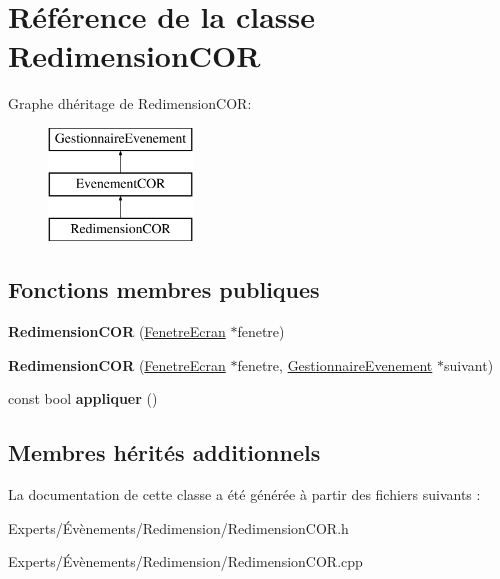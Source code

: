 \hypertarget{class_redimension_c_o_r}{}\section{Référence de la classe Redimension\+C\+OR}
\label{class_redimension_c_o_r}
Graphe d\textquotesingle{}héritage de Redimension\+C\+OR\+:\begin{figure}[H]
\begin{center}
\leavevmode
\includegraphics[height=3.000000cm]{class_redimension_c_o_r}
\end{center}
\end{figure}
\subsection*{Fonctions membres publiques}
\begin{DoxyCompactItemize}
\item 
\mbox{\label{class_redimension_c_o_r_a9176828f7658a9070f3f7401212a52e1}} 
{\bfseries Redimension\+C\+OR} (\mbox{\hyperlink{class_fenetre_ecran}{Fenetre\+Ecran}} $\ast$fenetre)
\item 
\mbox{\label{class_redimension_c_o_r_ad5b73b1a21796a9b2825b78249fd7830}} 
{\bfseries Redimension\+C\+OR} (\mbox{\hyperlink{class_fenetre_ecran}{Fenetre\+Ecran}} $\ast$fenetre, \mbox{\hyperlink{class_gestionnaire_evenement}{Gestionnaire\+Evenement}} $\ast$suivant)
\item 
\mbox{\label{class_redimension_c_o_r_aec5cb03878c15882651336a01b3ff2b2}} 
const bool {\bfseries appliquer} ()
\end{DoxyCompactItemize}
\subsection*{Membres hérités additionnels}


La documentation de cette classe a été générée à partir des fichiers suivants \+:\begin{DoxyCompactItemize}
\item 
Experts/Évènements/\+Redimension/Redimension\+C\+O\+R.\+h\item 
Experts/Évènements/\+Redimension/Redimension\+C\+O\+R.\+cpp\end{DoxyCompactItemize}
